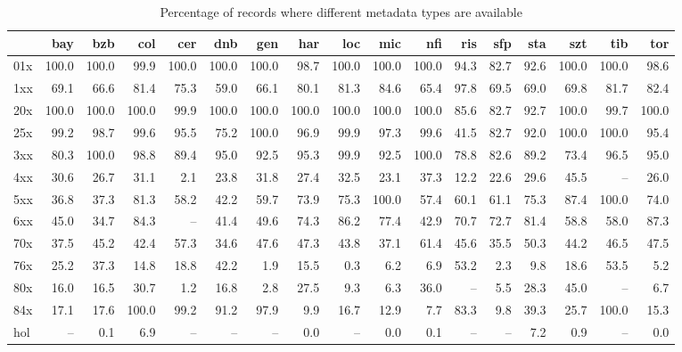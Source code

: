 \begin{table*}
\caption{Percentage of records where different metadata types are available}
\label{tab:completeness}
\begin{minipage}{17.5cm} %
\begin{center}
\begin{tabular}{lrrrrrrrrrrrrrrrr}
\toprule
 & bay & bzb & col & cer & dnb & gen & har & loc & mic & nfi & ris & sfp & sta & szt & tib & tor \\
\midrule
01x & 100.0 & 100.0 & 99.9 & 100.0 & 100.0 & 100.0 & 98.7 & 100.0 & 100.0 & 100.0 & 94.3 & 82.7 & 92.6 & 100.0 & 100.0 & 98.6 \\
1xx & 69.1 & 66.6 & 81.4 & 75.3 & 59.0 & 66.1 & 80.1 & 81.3 & 84.6 & 65.4 & 97.8 & 69.5 & 69.0 & 69.8 & 81.7 & 82.4 \\
20x & 100.0 & 100.0 & 100.0 & 99.9 & 100.0 & 100.0 & 100.0 & 100.0 & 100.0 & 100.0 & 85.6 & 82.7 & 92.7 & 100.0 & 99.7 & 100.0 \\
25x & 99.2 & 98.7 & 99.6 & 95.5 & 75.2 & 100.0 & 96.9 & 99.9 & 97.3 & 99.6 & 41.5 & 82.7 & 92.0 & 100.0 & 100.0 & 95.4 \\
3xx & 80.3 & 100.0 & 98.8 & 89.4 & 95.0 & 92.5 & 95.3 & 99.9 & 92.5 & 100.0 & 78.8 & 82.6 & 89.2 & 73.4 & 96.5 & 95.0 \\
4xx & 30.6 & 26.7 & 31.1 & 2.1 & 23.8 & 31.8 & 27.4 & 32.5 & 23.1 & 37.3 & 12.2 & 22.6 & 29.6 & 45.5 & -- & 26.0 \\
5xx & 36.8 & 37.3 & 81.3 & 58.2 & 42.2 & 59.7 & 73.9 & 75.3 & 100.0 & 57.4 & 60.1 & 61.1 & 75.3 & 87.4 & 100.0 & 74.0 \\
6xx & 45.0 & 34.7 & 84.3 & -- & 41.4 & 49.6 & 74.3 & 86.2 & 77.4 & 42.9 & 70.7 & 72.7 & 81.4 & 58.8 & 58.0 & 87.3 \\
70x & 37.5 & 45.2 & 42.4 & 57.3 & 34.6 & 47.6 & 47.3 & 43.8 & 37.1 & 61.4 & 45.6 & 35.5 & 50.3 & 44.2 & 46.5 & 47.5 \\
76x & 25.2 & 37.3 & 14.8 & 18.8 & 42.2 & 1.9 & 15.5 & 0.3 & 6.2 & 6.9 & 53.2 & 2.3 & 9.8 & 18.6 & 53.5 & 5.2 \\
80x & 16.0 & 16.5 & 30.7 & 1.2 & 16.8 & 2.8 & 27.5 & 9.3 & 6.3 & 36.0 & -- & 5.5 & 28.3 & 45.0 & -- & 6.7 \\
84x & 17.1 & 17.6 & 100.0 & 99.2 & 91.2 & 97.9 & 9.9 & 16.7 & 12.9 & 7.7 & 83.3 & 9.8 & 39.3 & 25.7 & 100.0 & 15.3 \\
hol & -- & 0.1 & 6.9 & -- & -- & -- & 0.0 & -- & 0.0 & 0.1 & -- & -- & 7.2 & 0.9 & -- & 0.0 \\

\end{tabular}
\end{center}
\end{minipage}
\end{table*}
